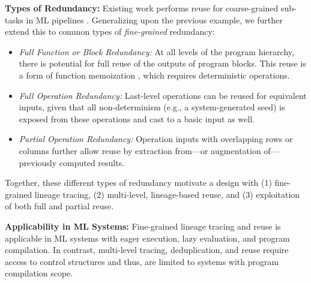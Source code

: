 \textbf{Types of Redundancy:} Existing work performs reuse for coarse-grained sub-tasks in ML pipelines \cite{SparksVKFR17, ZhangKR14, VartakTMZ18, XinMMLSP18, ShangZBKECBUK19, DerakhshanMARM20}. Generalizing upon the previous example, we further extend this to common types of \emph{fine-grained} redundancy:
\begin{itemize}
\item \emph{Full Function or Block Redundancy:} At all levels of the program hierarchy, there is potential for full reuse of the outputs of program blocks. This reuse is a form of function memoization \cite{CrankshawWZFGS17}, which requires deterministic operations. %
\item \emph{Full Operation Redundancy:} Last-level operations can be reused for equivalent inputs, given that all non-determinism (e.g., a system-generated seed) is exposed from these operations and cast to a basic input as well.
\item \emph{Partial Operation Redundancy:} Operation inputs with overlapping rows or columns further allow reuse by extraction from---or augmentation of---previously computed results.
\end{itemize}
Together, these different types of redundancy motivate a design with (1) fine-grained lineage tracing, (2) multi-level, lineage-based reuse, and (3) exploitation of both full and partial reuse.

\textbf{Applicability in ML Systems:} Fine-grained lineage tracing and reuse is applicable in ML systems with eager execution, lazy  evaluation, and program compilation. In contrast, multi-level tracing, deduplication, and reuse require access to control structures and thus, are limited to systems with program compilation scope.
